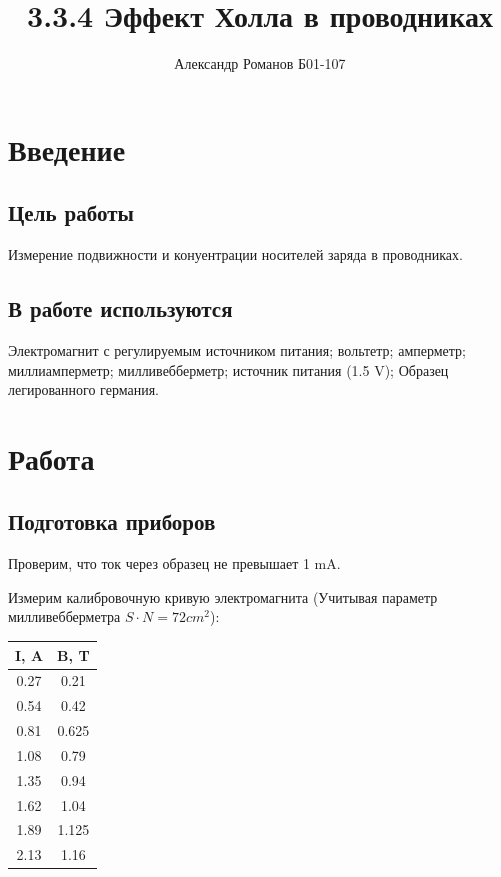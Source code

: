 \documentclass{article}
\author{Александр Романов Б01-107}
\date{}
\title{3.3.4 Эффект Холла в проводниках}
\begin{document}
\maketitle
\section{Введение}
\subsection{Цель работы}
Измерение подвижности и конуентрации носителей заряда в проводниках.
\subsection{В работе используются} 
Электромагнит с регулируемым источником питания; вольтетр; амперметр; миллиамперметр;
милливебберметр; источник питания (1.5 V); Образец легированного германия.

\section {Работа}
\subsection{Подготовка приборов}

Проверим, что ток через образец не превышает 1 mA.

Измерим калибровочную кривую электромагнита (Учитывая параметр милливебберметра \( S\cdot N = 72 cm^2 \)): 

\begin{table}[H]
    \centering
    \begin{tabular}{|c|c|}
        \hline
        I, A  & B, T  \\\hline
        0.27  & 0.21  \\\hline
        0.54  & 0.42  \\\hline
        0.81  & 0.625 \\\hline
        1.08  & 0.79  \\\hline
        1.35  & 0.94  \\\hline
        1.62  & 1.04  \\\hline
        1.89  & 1.125 \\\hline
        2.13  & 1.16  \\\hline  
    \end{tabular}
\end{table}
\end{document}
